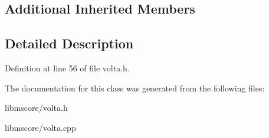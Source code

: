 \subsection*{Additional Inherited Members}


\subsection{Detailed Description}


Definition at line 56 of file volta.\+h.



The documentation for this class was generated from the following files\+:\begin{DoxyCompactItemize}
\item 
libmscore/volta.\+h\item 
libmscore/volta.\+cpp\end{DoxyCompactItemize}

